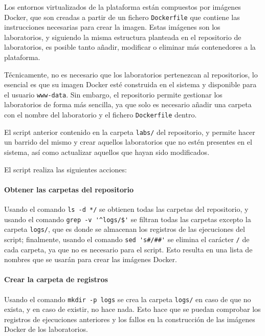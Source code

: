             \newpage

            Los entornos virtualizados de la plataforma están compuestos por imágenes Docker, que son creadas a partir de un fichero \texttt{Dockerfile} que contiene las instrucciones necesarias para crear la imagen. Estas imágenes son los laboratorios, y siguiendo la misma estructura planteada en el repositorio de laboratorios, es posible tanto añadir, modificar o eliminar más contenedores a la plataforma.

            Técnicamente, no es necesario que los laboratorios pertenezcan al repositorios, lo esencial es que su imagen Docker esté construida en el sistema y disponible para el usuario \texttt{www-data}. Sin embargo, el repositorio permite gestionar los laboratorios de forma más sencilla, ya que solo es necesario añadir una carpeta con el nombre del laboratorio y el fichero \texttt{Dockerfile} dentro.

            El script anterior contenido en la carpeta \texttt{labs/} del repositorio, y permite hacer un barrido del mismo y crear aquellos laboratorios que no estén presentes en el sistema, así como actualizar aquellos que hayan sido modificados.
            
            El script realiza las siguientes acciones:

            \paragraph{Obtener las carpetas del repositorio}
            
                Usando el comando \verb|ls -d */| se obtienen todas las carpetas del repositorio, y usando el comando \verb|grep -v '^logs/$'| se filtran todas las carpetas excepto la carpeta \texttt{logs/}, que es donde se almacenan los registros de las ejecuciones del script; finalmente, usando el comando \verb|sed 's#/##'| se elimina el carácter \texttt{/} de cada carpeta, ya que no es necesario para el script. Esto resulta en una lista de nombres que se usarán para crear las imágenes Docker.

            \paragraph{Crear la carpeta de registros}

                Usando el comando \texttt{mkdir -p logs} se crea la carpeta \texttt{logs/} en caso de que no exista, y en caso de existir, no hace nada. Esto hace que se puedan comprobar los registros de ejecuciones anteriores y los fallos en la construcción de las imágenes Docker de los laboratorios.

